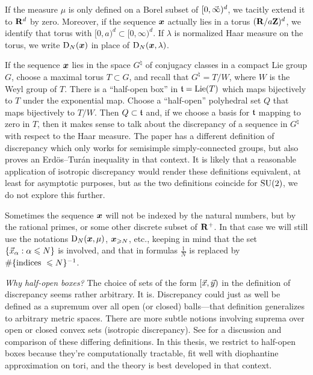 If the measure $\mu$ is only defined on a Borel subset of $[0,\vec{\infty})^d$, we 
tacitly extend it to $\mathbf{R}^d$ by zero. Moreover, if the sequence ${\boldsymbol x}$ actually 
lies in a torus $(\mathbf{R}/a \mathbf{Z})^d$, we identify that torus with  
$[0,a)^d\subset [0,\infty)^d$. If $\lambda$ is normalized Haar measure on the 
torus, we write $\operatorname{D}_N({\boldsymbol x})$ in place of $\operatorname{D}_N({\boldsymbol x}, \lambda)$. 

If the sequence ${\boldsymbol x}$ lies in the space $G^\natural$ of conjugacy classes in a 
compact Lie group $G$, choose a maximal torus $T\subset G$, and recall that 
$G^\natural = T/W$, where $W$ is the Weyl group of $T$. There is a ``half-open 
box'' in $\mathfrak{t} = \operatorname{Lie}(T)$ which maps bijectively to $T$ under the exponential 
map. Choose a ``half-open'' polyhedral set $Q$ that maps bijectively to $T/W$. 
Then $Q\subset \mathfrak{t}$ and, if we choose a basis for $\mathfrak{t}$ mapping to zero in 
$T$, then it makes sense to talk about the discrepancy of a sequence in 
$G^\natural$ with respect to the Haar measure. The paper 
\cite{rosengarten-2013} has a different definition of discrepancy which only 
works for semisimple simply-connected groups, but also proves an 
Erd\"os--Tur\'an inequality in that context. It is likely that a reasonable 
application of isotropic discrepancy would render these definitions equivalent, 
at least for asymptotic purposes, but as the two definitions coincide for 
$\operatorname{SU}(2)$, we do not explore this further. 

Sometimes the sequence ${\boldsymbol x}$ will not be indexed by the natural numbers, but 
by the rational primes, or some other discrete subset of $\mathbf{R}^+$. In that case 
we will still use the notations $\operatorname{D}_N({\boldsymbol x},\mu)$, ${\boldsymbol x}_{\geqslant N}$, etc., 
keeping in mind that the set $\{\vec{x}_\alpha : \alpha \leqslant N\}$ is involved, 
and that in formulas $\frac{1}{N}$ is replaced by 
$\#\{\textnormal{indices }\leqslant N\}^{-1}$. 

\emph{Why half-open boxes?} The choice of sets of the form $[\vec{x},\vec{y})$ in the 
definition of discrepancy seems rather arbitrary. It is. Discrepancy could just 
as well be defined as a supremum over all open (or closed) balls---that 
definition generalizes to arbitrary metric spaces. There are more subtle 
notions involving suprema over open or closed convex sets (isotropic 
discrepancy). See \cite{kuipers-niederreiter-1974} for a discussion and 
comparison of these differing definitions. In this thesis, we restrict to 
half-open boxes because they're computationally tractable, fit well with 
diophantine approximation on tori, and the theory is best developed in that 
context. 





